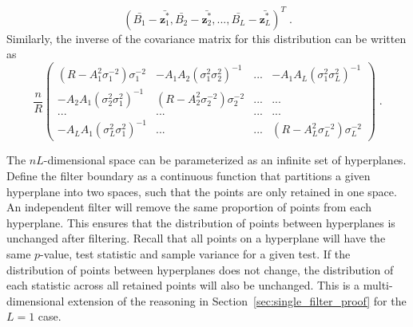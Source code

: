 \documentclass{article}
\newcommand{\nsamples}{n}
\newcommand{\normvar}{\sigma^2}
\newcommand{\logcount}{z}
\newcommand{\instance}[0]{\mathbf{\logcount}^*}
\newcommand{\ntests}{L}
\newcommand{\scaling}{A}
\newcommand{\interceptor}{B}
\newcommand{\internalR}{R}
\newcommand{\invertvar}{\sigma^{-2}}
\begin{document}
\[
(\bar{\interceptor_1}-\bar{\instance_1}, \bar{\interceptor_2} - \bar{\instance_2}, ..., \bar{\interceptor_\ntests} - \bar{\instance_\ntests})^T \;.
\]
Similarly, the inverse of the covariance matrix for this distribution can be written as
\[
\frac{\nsamples}{\internalR} \begin{pmatrix}
(\internalR - \scaling_1^2\invertvar_1)\invertvar_1 & -\scaling_1\scaling_2(\normvar_1\normvar_2)^{-1} & ... & -\scaling_1\scaling_\ntests(\normvar_1\normvar_\ntests)^{-1} \\
-\scaling_2\scaling_1(\normvar_2\normvar_1)^{-1} & (R - \scaling_2^2\invertvar_2)\invertvar_2 & ... & ... \\
   ... & ... & ... & ... \\
-\scaling_\ntests\scaling_1(\normvar_\ntests\normvar_1)^{-1} & ... & ... & (\internalR - \scaling_\ntests^2\invertvar_\ntests)\invertvar_\ntests
\end{pmatrix} \; .
\]

The $\nsamples\ntests$-dimensional space can be parameterized as an infinite set of hyperplanes. 
Define the filter boundary as a continuous function that partitions a given hyperplane into two spaces, such that the points are only retained in one space.
An independent filter will remove the same proportion of points from each hyperplane.
This ensures that the distribution of points between hyperplanes is unchanged after filtering.
Recall that all points on a hyperplane will have the same $p$-value, test statistic and sample variance for a given test.
If the distribution of points between hyperplanes does not change, the distribution of each statistic across all retained points will also be unchanged.
This is a multi-dimensional extension of the reasoning in Section~\ref{sec:single_filter_proof} for the $\ntests = 1$ case. 
\end{document}
